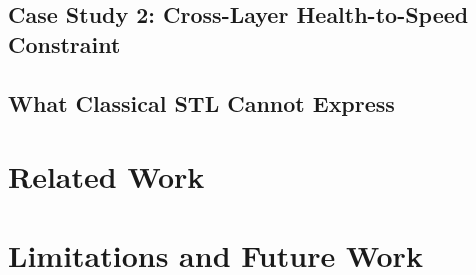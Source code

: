 \documentclass[runningheads]{llncs}
\begin{document}
\subsection{Case Study 2: Cross-Layer Health-to-Speed Constraint}

\subsection{What Classical STL Cannot Express}

\section{Related Work}
\label{sec:related}


\section{Limitations and Future Work}
\label{sec:future}
\end{document}
